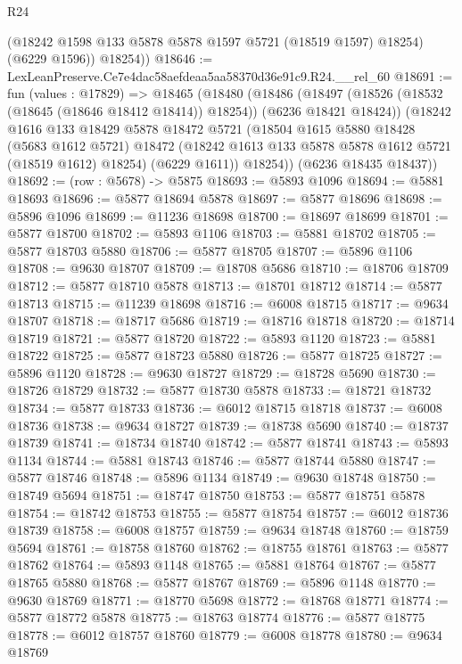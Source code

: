 \begin{lexlean}{R24}
\begin{coremodule}
          (@18242 @1598 @133 @5878 @5878 @1597 @5721 (@18519 @1597) @18254)
          (@6229 @1596))
        @18254))
@18646 := LexLeanPreserve.Ce7e4dac58aefdeaa5aa58370d36e91c9.R24.__rel_60
@18691 := fun (values : @17829) =>
  @18465
    (@18480
      (@18486
        (@18497 (@18526 (@18532 (@18645 (@18646 @18412 @18414)) @18254)) (@6236 @18421 @18424))
        (@18242
          @1616
          @133
          @18429
          @5878
          @18472
          @5721
          (@18504
            @1615
            @5880
            @18428
            (@5683 @1612 @5721)
            @18472
            (@18242 @1613 @133 @5878 @5878 @1612 @5721 (@18519 @1612) @18254)
            (@6229 @1611))
          @18254))
      (@6236 @18435 @18437))
@18692 := (row : @5678) -> @5875
@18693 := @5893 @1096
@18694 := @5881 @18693
@18696 := @5877 @18694 @5878
@18697 := @5877 @18696
@18698 := @5896 @1096
@18699 := @11236 @18698
@18700 := @18697 @18699
@18701 := @5877 @18700
@18702 := @5893 @1106
@18703 := @5881 @18702
@18705 := @5877 @18703 @5880
@18706 := @5877 @18705
@18707 := @5896 @1106
@18708 := @9630 @18707
@18709 := @18708 @5686
@18710 := @18706 @18709
@18712 := @5877 @18710 @5878
@18713 := @18701 @18712
@18714 := @5877 @18713
@18715 := @11239 @18698
@18716 := @6008 @18715
@18717 := @9634 @18707
@18718 := @18717 @5686
@18719 := @18716 @18718
@18720 := @18714 @18719
@18721 := @5877 @18720
@18722 := @5893 @1120
@18723 := @5881 @18722
@18725 := @5877 @18723 @5880
@18726 := @5877 @18725
@18727 := @5896 @1120
@18728 := @9630 @18727
@18729 := @18728 @5690
@18730 := @18726 @18729
@18732 := @5877 @18730 @5878
@18733 := @18721 @18732
@18734 := @5877 @18733
@18736 := @6012 @18715 @18718
@18737 := @6008 @18736
@18738 := @9634 @18727
@18739 := @18738 @5690
@18740 := @18737 @18739
@18741 := @18734 @18740
@18742 := @5877 @18741
@18743 := @5893 @1134
@18744 := @5881 @18743
@18746 := @5877 @18744 @5880
@18747 := @5877 @18746
@18748 := @5896 @1134
@18749 := @9630 @18748
@18750 := @18749 @5694
@18751 := @18747 @18750
@18753 := @5877 @18751 @5878
@18754 := @18742 @18753
@18755 := @5877 @18754
@18757 := @6012 @18736 @18739
@18758 := @6008 @18757
@18759 := @9634 @18748
@18760 := @18759 @5694
@18761 := @18758 @18760
@18762 := @18755 @18761
@18763 := @5877 @18762
@18764 := @5893 @1148
@18765 := @5881 @18764
@18767 := @5877 @18765 @5880
@18768 := @5877 @18767
@18769 := @5896 @1148
@18770 := @9630 @18769
@18771 := @18770 @5698
@18772 := @18768 @18771
@18774 := @5877 @18772 @5878
@18775 := @18763 @18774
@18776 := @5877 @18775
@18778 := @6012 @18757 @18760
@18779 := @6008 @18778
@18780 := @9634 @18769

\end{coremodule}
\end{lexlean}
